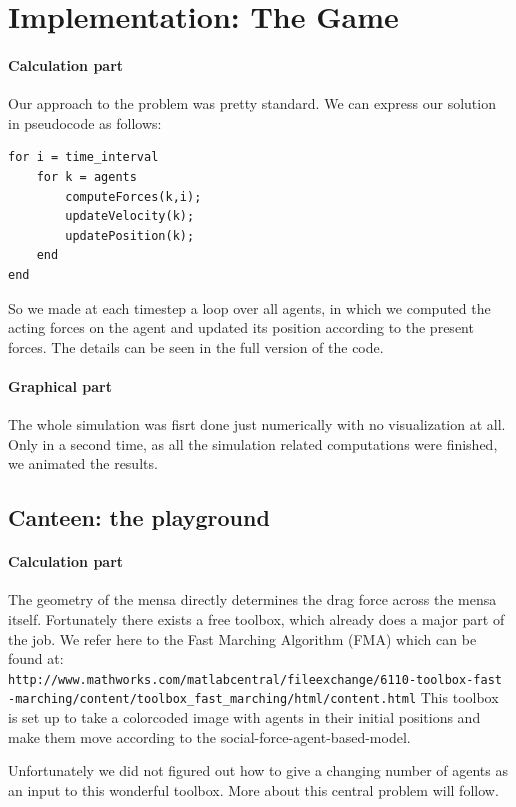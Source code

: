 \documentclass[11pt]{article}
\begin{document}
\newpage

\section{Implementation: The Game}

\paragraph{Calculation part}
Our approach to the problem was pretty standard. We can express our solution in pseudocode as follows:
\begin{lstlisting}[frame=lines]
for i = time_interval
	for k = agents
		computeForces(k,i);
		updateVelocity(k);
		updatePosition(k);
	end
end
\end{lstlisting}
So we made at each timestep a loop over all agents, in which we computed the acting forces on the agent and updated its position according to the present forces. The details can be seen in the full version of the code.

\paragraph{Graphical part} The whole simulation was fisrt done just numerically with no visualization at all. Only in a second time, as all the simulation related computations were finished, we animated the results.

\subsection{Canteen: the playground}

\paragraph{Calculation part} The geometry of the mensa directly determines the drag force across the mensa itself. Fortunately there exists a free toolbox, which already does a major part of the job. We refer here to the Fast Marching Algorithm (FMA) which can be found at:\\
\verb"http://www.mathworks.com/matlabcentral/fileexchange/6110-toolbox-fast"\\
\verb"-marching/content/toolbox_fast_marching/html/content.html"
This toolbox is set up to take a colorcoded image with agents in their initial positions and make them move according to the social-force-agent-based-model.

Unfortunately we did not figured out how to give a changing number of agents as an input to this wonderful toolbox. More about this central problem will follow.
\end{document}
